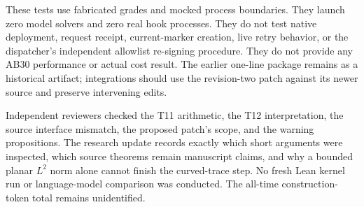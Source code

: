 These tests use fabricated grades and mocked process boundaries. They launch zero model solvers and zero real hook processes. They do not test native deployment, request receipt, current-marker creation, live retry behavior, or the dispatcher's independent allowlist re-signing procedure. They do not provide any AB30 performance or actual cost result. The earlier one-line package remains as a historical artifact; integrations should use the revision-two patch against its newer source and preserve intervening edits.

Independent reviewers checked the T11 arithmetic, the T12 interpretation, the source interface mismatch, the proposed patch's scope, and the warning propositions. The research update records exactly which short arguments were inspected, which source theorems remain manuscript claims, and why a bounded planar $L^2$ norm alone cannot finish the curved-trace step. No fresh Lean kernel run or language-model comparison was conducted. The all-time construction-token total remains unidentified.

